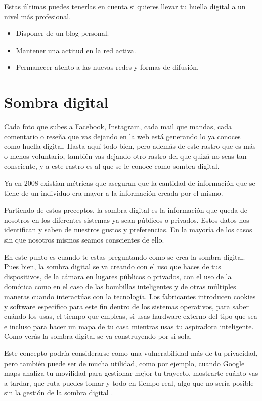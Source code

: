 \documentclass[
  spanish,
  a4paper,
  openany]{book}
\begin{document}
Estas últimas puedes tenerlas en cuenta si quieres llevar tu huella digital a un nivel más profesional.

\begin{itemize}
\item
  Disponer de un blog personal.
\item
  Mantener una actitud en la red activa.
\item
  Permanecer atento a las nuevas redes y formas de difusión.
\end{itemize}

\hypertarget{sombra-digital}{%
\section{Sombra digital}\label{sombra-digital}}

Cada foto que subes a Facebook, Instagram, cada mail que mandas, cada comentario o reseña que vas dejando en la web está generando lo ya conoces como huella digital. Hasta aquí todo bien, pero además de este rastro que es más o menos voluntario, también vas dejando otro rastro del que quizá no seas tan consciente, y a este rastro es al que se le conoce como sombra digital.

Ya en 2008 existían métricas que aseguran que la cantidad de información que se tiene de un individuo era mayor a la información creada por el mismo.

Partiendo de estos preceptos, la sombra digital es la información que queda de nosotros en los diferentes sistemas ya sean públicos o privados. Estos datos nos identifican y saben de nuestros gustos y preferencias. En la mayoría de los casos sin que nosotros mismos seamos conscientes de ello.

En este punto es cuando te estas preguntando como se crea la sombra digital. Pues bien, la sombra digital se va creando con el uso que haces de tus dispositivos, de la cámara en lugares públicos o privados, con el uso de la domótica como en el caso de las bombillas inteligentes y de otras múltiples maneras cuando interactúas con la tecnología. Los fabricantes introducen cookies y software específico para este fin dentro de los sistemas operativos, para saber cuándo los usas, el tiempo que empleas, si usas hardware externo del tipo que sea e incluso para hacer un mapa de tu casa mientras usas tu aspiradora inteligente. Como verás la sombra digital se va construyendo por si sola.

Este concepto podría considerarse como una vulnerabilidad más de tu privacidad, pero también puede ser de mucha utilidad, como por ejemplo, cuando Google maps analiza tu movilidad para gestionar mejor tu trayecto, mostrarte cuánto vas a tardar, que ruta puedes tomar y todo en tiempo real, algo que no sería posible sin la gestión de la sombra digital \citep{XATAKA-sombra-digital}.
\end{document}
